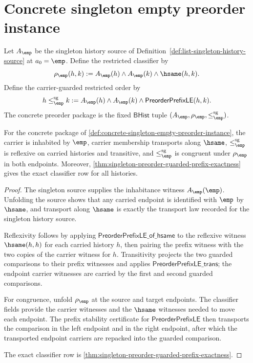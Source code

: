 \section{Concrete singleton empty preorder instance}
\label{sec:preorder-concrete-singleton-empty-instance}

\begin{definition}
\label{def:concrete-singleton-empty-preorder-instance}
Let $A_{\emp}$ be the singleton history source of
Definition~\ref{def:list-singleton-history-source} at $a_0=\emp$. Define the
restricted classifier by
$$
\rho_{\emp}(h,k):=
A_{\emp}(h)\land A_{\emp}(k)\land\hsame(h,k).
$$
Define the carrier-guarded restricted order by
$$
h\le_{\emp}^{\mathrm{sg}}k:=
A_{\emp}(h)\land A_{\emp}(k)\land \mathsf{PreorderPrefixLE}(h,k).
$$
The concrete preorder package is the fixed $\mathsf{BHist}$ tuple
$(A_{\emp},\rho_{\emp},\le_{\emp}^{\mathrm{sg}})$.
\end{definition}

\begin{theorem}
\label{thm:singleton-empty-preorder-laws}
For the concrete package of
\autoref{def:concrete-singleton-empty-preorder-instance}, the carrier is
inhabited by $\emp$, carrier membership transports along $\hsame$,
$\le_{\emp}^{\mathrm{sg}}$ is reflexive on carried histories and transitive,
and $\le_{\emp}^{\mathrm{sg}}$ is congruent under $\rho_{\emp}$ in both
endpoints. Moreover,
\autoref{thm:singleton-preorder-guarded-prefix-exactness} gives the exact
classifier row for all histories.
\end{theorem}
\begin{proof}
The singleton source supplies the inhabitance witness $A_{\emp}(\emp)$.
Unfolding the source shows that any carried endpoint is identified with
$\emp$ by $\hsame$, and transport along $\hsame$ is exactly the transport law
recorded for the singleton history source.

Reflexivity follows by applying
$\mathsf{PreorderPrefixLE\_of\_hsame}$ to the reflexive witness
$\hsame(h,h)$ for each carried history $h$, then pairing the prefix witness
with the two copies of the carrier witness for $h$. Transitivity projects the
two guarded comparisons to their prefix witnesses and applies
$\mathsf{PreorderPrefixLE\_trans}$; the endpoint carrier witnesses are carried
by the first and second guarded comparisons.

For congruence, unfold $\rho_{\emp}$ at the source and target endpoints. The
classifier fields provide the carrier witnesses and the $\hsame$ witnesses
needed to move each endpoint. The prefix stability certificate for
$\mathsf{PreorderPrefixLE}$ then transports the comparison in the left endpoint
and in the right endpoint, after which the transported endpoint carriers are
repacked into the guarded comparison.

The exact classifier row is
\autoref{thm:singleton-preorder-guarded-prefix-exactness}.
\end{proof}

